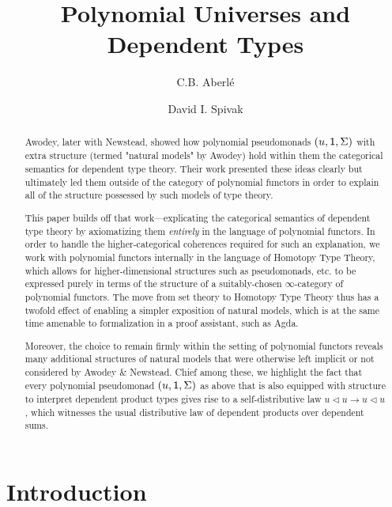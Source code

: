 \documentclass[
  11pt,
  oneside,
  article]{memoir}
\title{Polynomial Universes and Dependent Types}
\author{C.B. Aberlé \and David I. Spivak}
\date{}
\theoremstyle{definition}
\theoremstyle{plain}
\newcommand{\0}{\textsf{0}}
\newcommand{\1}{\tn{\textsf{1}}}
\newcommand{\tri}{\mathbin{\triangleleft}}
\begin{document}
\makeatletter
{}
\makeatother
\maketitle

\makeatletter
{}
\makeatother
\begin{abstract}

Awodey, later with Newstead, showed how polynomial pseudomonads $(u,\1,\Sigma)$ with extra structure (termed "natural models" by Awodey) hold within them the categorical semantics for dependent type theory. Their work presented these ideas clearly but ultimately led them outside of the category of polynomial functors in order to explain all of the structure possessed by such models of type theory.

This paper builds off that work---explicating the categorical semantics of dependent type theory by axiomatizing them \emph{entirely} in the language of polynomial functors. In order to handle the higher-categorical coherences required for such an explanation, we work with polynomial functors internally in the language of Homotopy Type Theory, which allows for higher-dimensional structures such as pseudomonads, etc. to be expressed purely in terms of the structure of a suitably-chosen $\infty$-category of polynomial functors. The move from set theory to Homotopy Type Theory thus has a twofold effect of enabling a simpler exposition of natural models, which is at the same time amenable to formalization in a proof assistant, such as Agda.

Moreover, the choice to remain firmly within the setting of polynomial functors reveals many additional structures of natural models that were otherwise left implicit or not considered by Awodey \& Newstead. Chief among these, we highlight the fact that every polynomial pseudomonad $(u,\1,\Sigma)$ as above that is also equipped with structure to interpret dependent product types gives rise to a self-distributive law $u\tri u\to u\tri u$, which witnesses the usual distributive law of dependent products over dependent sums.

\end{abstract}

\chapter{Introduction}\label{introduction}
\end{document}
